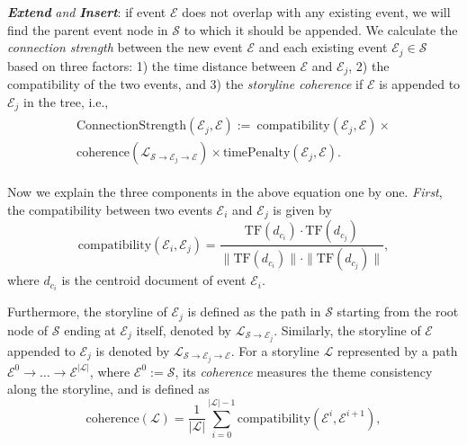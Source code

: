 {\bf\emph{Extend}} \emph{and} {\bf \emph{Insert}}: if event $\mathcal{E}$ does not overlap with any existing event, we will find the parent event node in $\mathcal{S}$ to which it should be appended.
We calculate the \emph{connection strength} between the new event $\mathcal{E}$ and each existing event $\mathcal{E}_j \in \mathcal{S}$ based on three factors: 1) the time distance between $\mathcal{E}$ and $\mathcal{E}_j$, 2) the compatibility of the two events, and 3) the \emph{storyline coherence} if $\mathcal{E}$ is appended to $\mathcal{E}_j$ in the tree, i.e., 
\begin{align}
\label{eqn:linkScore} 
\begin{split}
  \text{ConnectionStrength}(\mathcal{E}_j, \mathcal{E})  :=\ \text{compatibility}(\mathcal{E}_j, \mathcal{E}) \times \\
  \text{coherence}(\mathcal{L}_{\mathcal{S}\to\mathcal{E}_j\to \mathcal{E}}) \times \text{timePenalty}(\mathcal{E}_j, \mathcal{E}).
\end{split}
\end{align}

Now we explain the three components in the above equation one by one. \emph{First}, the compatibility between two events $\mathcal{E}_i$ and $\mathcal{E}_j$ is given by
\begin{equation}
  \text{compatibility}(\mathcal{E}_i, \mathcal{E}_j) = \frac{\text{TF}(d_{c_i}) \cdot \text{TF}(d_{c_{j}})}{\|\text{TF}(d_{c_i})\| \cdot \|\text{TF}(d_{c_{j}})\|},
\end{equation}
where $d_{c_i}$ is the centroid document of event $\mathcal{E}_i$.

Furthermore, the storyline of $\mathcal{E}_j$ is defined as the path in $\mathcal{S}$ starting from the root node of $\mathcal{S}$ ending at $\mathcal{E}_j$ itself, denoted by $\mathcal{L}_{\mathcal{S}\rightarrow \mathcal{E}_j}$. Similarly, the storyline of $\mathcal{E}$ appended to $\mathcal{E}_j$ is denoted by $\mathcal{L}_{\mathcal{S}\rightarrow \mathcal{E}_j\rightarrow\mathcal{E}}$.
For a storyline $\mathcal{L}$ represented by a path
$\mathcal{E}^0\to \ldots \to \mathcal{E}^{|\mathcal{L}|}$, where $\mathcal{E}^0 := \mathcal S$, its \textit{coherence} \cite{xu2013summarizing} measures the theme consistency along the storyline, and is defined as
\begin{equation}
  \text{coherence}(\mathcal{L}) = \frac{1}{|\mathcal{L}|}\sum_{i=0}^{|\mathcal{L}|-1} \text{compatibility}(\mathcal{E}^i, \mathcal{E}^{i+1}),
\end{equation}

